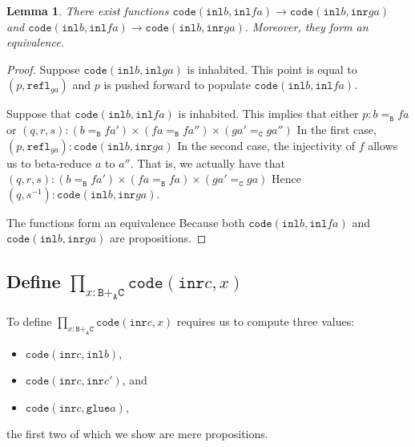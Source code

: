\message{ !name(notes.tex)}\documentclass[12pt]{amsart}
\newcommand{\inv}{^{-1}}
\newcommand{\type}[1]{\mathtt{#1}}
\newcommand{\tin}{\colon}
\newcommand{\A}{\type{A}}
\newcommand{\B}{\type{B}}
\newcommand{\C}{\type{C}}
\newcommand{\BAC}{\B +_{\A} \C}
\newcommand{\inl}{\type{inl}}
\newcommand{\inr}{\type{inr}}
\newcommand{\glue}{\type{glue}}
\newcommand{\refl}{\type{refl}}
\newcommand{\code}{\type{code}}
\newtheorem{lemma}{Lemma}
\theoremstyle{remark}
\theoremstyle{definition}
\begin{document}
\begin{lemma} \label{thm:code-faga-populated-empty}
%
  There exist functions
  \(
      \code ( \inl b , \inl fa ) \to \code ( \inl b , \inr ga )
  \)
  and
  \(
      \code ( \inl b , \inl fa ) \to \code ( \inl b , \inr ga ).
  \)
  Moreover, they form an equivalence.
%
\end{lemma}
\begin{proof}
%  
  Suppose
  \(
      \code ( \inl b , \inl ga )
  \)
  is inhabited. This point is equal to
  \(
      ( p , \refl_{ga} )
  \)
  and \( p \) is pushed forward to populate
  \(
      \code ( \inl b , \inl fa ). 
  \)
  \par
  
  Suppose that
  \(
       \code ( \inl b , \inl fa )
  \)
  is inhabited.  This implies that either
  \(
       p \tin b =_\B fa 
  \)
  or
  \(
     ( q,r,s ) \tin
     ( b =_\B fa' ) \times ( fa =_\B fa'' ) \times ( ga' =_\C ga'' )
  \)
  In the first case,
  \(
      ( p , \refl_{ga} ) \tin \code ( \inl b , \inr ga )
  \)
  In the second case, the injectivity of \( f \) allows us to
  beta-reduce \( a \) to \( a'' \). That is, we actually have that
  \(
      (q,r,s) \tin
      ( b =_\B fa' ) \times ( fa =_\B fa ) \times ( ga' =_\C ga )
  \)
  Hence
  \(
      ( q , s\inv ) \tin \code ( \inl b , \inr ga ).
  \)

  The functions form an equivalence Because both
  \(
      \code ( \inl b , \inl fa )
  \)
  and
  \(
      \code ( \inl b , \inr ga )
  \)
  are propositions.
%  
\end{proof}


\subsection{Define \( \prod_{x \tin \BAC } \code ( \inr c , x ) \)} 
\label{sec:codecx}

To define
%
\(
    \prod\limits_{x \tin \BAC} \code ( \inr c , x  )
\)
% 
requires us to compute three values:
\begin{itemize}
\item \( \code ( \inr c , \inl b ) \),
\item \( \code ( \inr c , \inr c' ) \), and
\item \( \code ( \inr c , \glue a ) \),
\end{itemize}
the first two of which we show are mere propositions.
\end{document}
